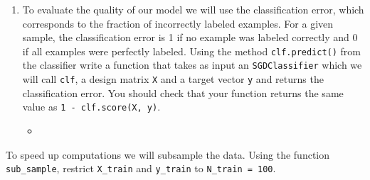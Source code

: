 \documentclass{article}
\begin{document}
\begin{enumerate}
\setcounter{enumi}{\value{saveenum}}
  \item To evaluate the quality of our model we will use the classification error, which corresponds to the fraction of incorrectly labeled examples. For a given sample, the classification error is 1 if no example was labeled correctly and 0 if all examples were perfectly labeled. 
  Using the method \texttt{clf.predict()} from the classifier write a function that takes as input an \texttt{SGDClassifier} which we will call \texttt{clf}, a design matrix \texttt{X} and a target vector \texttt{y} and returns the classification error. You should check that    your function returns the same value as \newline \texttt{1 - clf.score(X, y)}.
\begin{itemize}
    \item \inputminted[firstline=235, lastline=274, breaklines=True]{python}{HW_2.PY.py}
\end{itemize}
  
\setcounter{saveenum}{\value{enumi}}
\end{enumerate}


To speed up computations we will subsample the data. Using the function \texttt{sub\_sample}, restrict \texttt{X\_train} and \texttt{y\_train} to \texttt{N\_train = 100}. 
\end{document}
